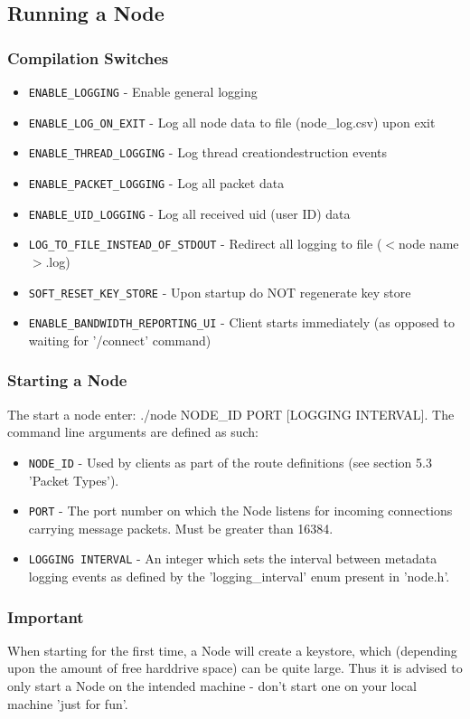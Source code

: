 \documentclass{article}
\begin{document}
\subsection{Running a Node}
\subsubsection{Compilation Switches}
\begin{itemize}
	\item \texttt{ENABLE\_LOGGING} - Enable general logging
	\item \texttt{ENABLE\_LOG\_ON\_EXIT} - Log all node data to file (node\_log.csv) upon exit 
	\item \texttt{ENABLE\_THREAD\_LOGGING} - Log thread creation\/destruction events
	\item \texttt{ENABLE\_PACKET\_LOGGING} - Log all packet data
	\item \texttt{ENABLE\_UID\_LOGGING} - Log all received uid (user ID) data
	\item \texttt{LOG\_TO\_FILE\_INSTEAD\_OF\_STDOUT} - Redirect all logging to file ($<$node name$>$.log)
	\item \texttt{SOFT\_RESET\_KEY\_STORE} - Upon startup do NOT regenerate key store
	\item \texttt{ENABLE\_BANDWIDTH\_REPORTING\_UI} - Client starts immediately (as opposed to waiting for '/connect' command)
\end{itemize}
\subsubsection{Starting a Node}
The start a node enter: ./node NODE\_ID PORT [LOGGING INTERVAL]. The command line arguments are defined as such:
\begin{itemize}
	\item \texttt{NODE\_ID} - Used by clients as part of the route definitions (see section 5.3 'Packet Types').
	\item \texttt{PORT} - The port number on which the Node listens for incoming connections carrying message packets. Must be greater than 16384. 
	\item \texttt{LOGGING INTERVAL} - An integer which sets the interval between metadata logging events as defined by the 'logging\_interval' enum present in 'node.h'.
\end{itemize}
\subsubsection{Important}
When starting for the first time, a Node will create a keystore, which (depending upon the amount of free harddrive space) can be quite large. Thus it 
is advised to only start a Node on the intended machine - don't start one on your local machine 'just for fun'.
\end{document}
